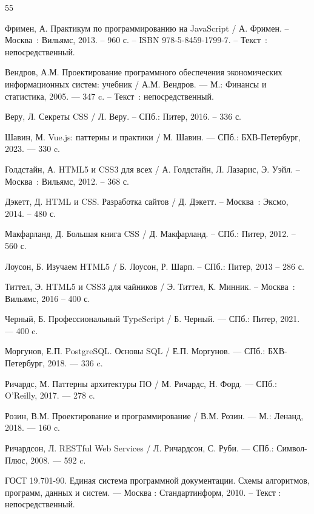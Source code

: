 
\begin{thebibliography}{55}
	
	 Фримен, А. Практикум по программированию на JavaScript / А. Фримен. – Москва~: Вильямс, 2013. – 960 с. – ISBN 978-5-8459-1799-7. – Текст~: непосредственный.
	
	 Вендров, А.М. Проектирование программного обеспечения экономических информационных систем: учебник / А.М. Вендров. — М.: Финансы и статистика, 2005. — 347 c. – Текст~: непосредственный.
	
	 Веру, Л. Секреты CSS / Л. Веру. – СПб.: Питер, 2016. – 336 с.
	
	 Шавин, М. Vue.js: паттерны и практики / М. Шавин. — СПб.: БХВ-Петербург, 2023. — 330 c.
	
	 Голдстайн, А. HTML5 и CSS3 для всех / А. Голдстайн, Л. Лазарис, Э. Уэйл. – Москва~: Вильямс, 2012. – 368 с.
	
	 Дэкетт, Д. HTML и CSS. Разработка сайтов / Д. Дэкетт. – Москва~: Эксмо, 2014. – 480 с.
	
	 Макфарланд, Д. Большая книга CSS / Д. Макфарланд. – СПб.: Питер, 2012. – 560 с.
	
	 Лоусон, Б. Изучаем HTML5 / Б. Лоусон, Р. Шарп. – СПб.: Питер, 2013 – 286 с.
	
	 Титтел, Э. HTML5 и CSS3 для чайников / Э. Титтел, К. Минник. – Москва~: Вильямс, 2016 – 400 с.
	
	 Черный, Б. Профессиональный TypeScript / Б. Черный. — СПб.: Питер, 2021. — 400 c.
	
	 Моргунов, Е.П. PostgreSQL. Основы SQL / Е.П. Моргунов. — СПб.: БХВ-Петербург, 2018. — 336 c.
	
	 Ричардс, М. Паттерны архитектуры ПО / М. Ричардс, Н. Форд. — СПб.: O’Reilly, 2017. — 278 c.
	
	 Розин, В.М. Проектирование и программирование / В.М. Розин. — М.: Ленанд, 2018. — 160 c.
	
	 Ричардсон, Л. RESTful Web Services / Л. Ричардсон, С. Руби. — СПб.: Символ-Плюс, 2008. — 592 c.
	
	 ГОСТ 19.701-90. Единая система программной документации. Схемы алгоритмов, программ, данных и систем. — Москва : Стандартинформ, 2010. – Текст : непосредственный.
	

\end{thebibliography}
